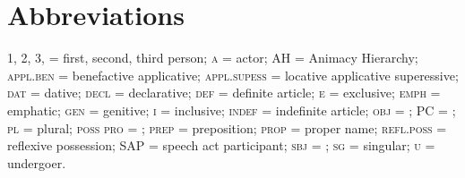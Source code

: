 \documentclass[output=paper]{LSP/langsci}
\begin{document}
\section*{Abbreviations}

1, 2, 3, = first, second, third person; \textsc{a} = actor; AH = Animacy Hierarchy; \textsc{appl.ben} = benefactive applicative; \textsc{appl.supess} = locative applicative superessive; \textsc{dat} = dative; \textsc{decl} = declarative; \textsc{def} = definite article; \textsc{e} = exclusive; \textsc{emph} = emphatic; \textsc{gen} = genitive; \textsc{i} = inclusive; \textsc{indef} = indefinite article; \textsc{obj} = ; PC = ; \textsc{pl} = plural; \textsc{poss pro} = ; \textsc{prep} = preposition; \textsc{prop} = proper name; \textsc{refl.poss} = reflexive possession; SAP = speech act participant; \textsc{sbj} = ; \textsc{sg} = singular; \textsc{u} = undergoer.
 \printbibliography[heading=subbibliography,notkeyword=this]
 
\end{document}

